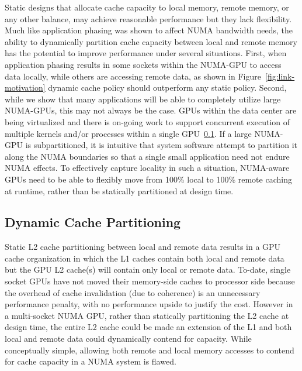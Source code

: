
Static designs that allocate cache capacity to local memory, remote memory, or any other balance,
 may achieve reasonable performance but they lack flexibility. Much
like application phasing was shown to affect NUMA bandwidth needs, the ability to
dynamically partition cache capacity between local and remote memory has the potential
to improve performance under several situations. First, when application phasing
results in some sockets within the NUMA-GPU to access data locally, while others
are accessing remote data, as shown in Figure~\ref{fig:link-motivation} dynamic
cache policy should outperform any static policy. Second, while we show that many
applications will be able to completely utilize large NUMA-GPUs, this may not always
be the case.  GPUs within the data center are being virtualized and there is on-going
work to support concurrent execution of multiple kernels and/or processes within a
single GPU~\ref{}. If a large NUMA-GPU is subpartitioned, it is intuitive that system
software attempt to partition it along the NUMA boundaries so that a single small
application need not endure NUMA effects.  To effectively capture locality in such
a situation, NUMA-aware GPUs need to be able to flexibly move from 100\% local to
100\% remote caching at runtime, rather than be statically partitioned at design time.

\subsection{Dynamic Cache Partitioning}

Static L2 cache partitioning between local and remote data results in a GPU cache
organization in which the L1 caches contain both local and remote data but the GPU
L2 cache(s) will contain only local or remote data.  To-date, single socket GPUs
have not moved their memory-side caches to processor side because the overhead of
cache invalidation (due to coherence) is an unnecessary performance penalty, with
no performance upside to justify the cost.  However in a multi-socket NUMA GPU,
rather than statically partitioning the L2 cache at design time, the entire L2 cache
could be made an extension of the L1 and both local and remote data could dynamically
contend for capacity.  While conceptually simple, allowing both remote and local
memory accesses to contend for cache capacity in a NUMA system is flawed.

